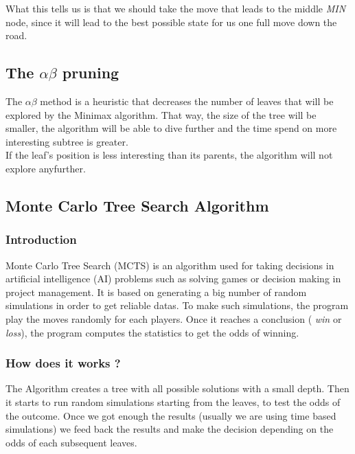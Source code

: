 What this tells us is that we should take the move that leads to the middle  \textit{MIN} node, since it will lead to the best possible state for us one full move down the road.

\subsection{The \ensuremath{\alpha\beta} pruning} %
The \ensuremath{\alpha\beta} method is a heuristic that decreases the number of leaves that will be explored by the Minimax algorithm. That way, the size of the tree will be smaller, the algorithm will be able to dive further and the time spend on more interesting subtree is greater.\\
If the leaf's position is less interesting than its parents, the algorithm will not explore anyfurther.

\subsection{Monte Carlo Tree Search Algorithm}
\subsubsection{Introduction}
Monte Carlo Tree Search (MCTS) is an algorithm used for taking decisions in artificial intelligence (AI) problems such as solving games or decision making in project management. It is based on generating a big number of random simulations in order to get reliable datas. To make such simulations, the program play the moves randomly for each players. Once it reaches a conclusion ( \textit{win} or  \textit{loss}), the program computes the statistics to get the odds of winning.
\subsubsection{How does it works ?}
The Algorithm creates a tree with all possible solutions with a small depth.
Then it starts to run random simulations starting from the leaves, to test the odds of the outcome.
Once we got enough the results (usually we are using time based simulations) we feed back the results and make the decision depending on the odds of each subsequent leaves.
